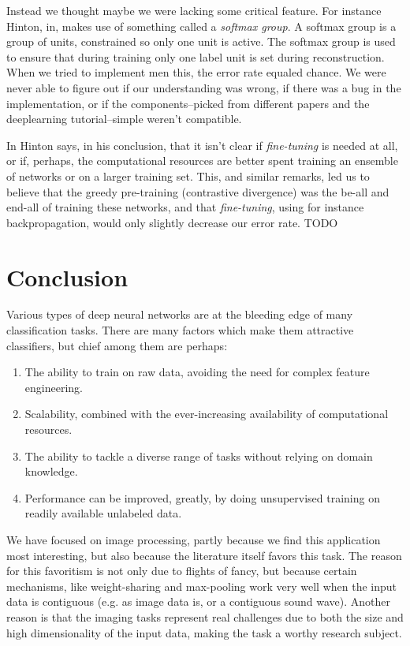 \documentclass[11pt]{article}
\begin{document}
Instead we thought maybe we were lacking some critical feature. For instance Hinton, in\cite{hinton06}, makes use of something called a \textit{softmax group}.  A softmax group is a group of units, constrained so only one unit is active.  The softmax group is used to ensure that during training only one label unit is set during reconstruction.  When we tried to implement men this, the error rate equaled chance.  We were never able to figure out if our understanding was wrong, if there was a bug in the implementation, or if the components--picked from different papers and the deeplearning tutorial--simple weren't compatible.

In \cite{hinton06} Hinton says, in his conclusion, that it isn't clear if \textit{fine-tuning} is needed at all, or if, perhaps, the computational resources are better spent training an ensemble of networks or on a larger training set.  This, and similar remarks, led us to believe that the greedy pre-training (contrastive divergence) was the be-all and end-all of training these networks, and that \textit{fine-tuning}, using for instance backpropagation, would only slightly decrease our error rate.  TODO

\section{Conclusion}

Various types of deep neural networks are at the bleeding edge of many classification tasks.  There are many factors which make them attractive classifiers, but chief among them are perhaps:
\begin{enumerate}
\item The ability to train on raw data, avoiding the need for complex feature engineering.
\item Scalability, combined with the ever-increasing availability of computational resources.
\item The ability to tackle a diverse range of tasks without relying on domain knowledge.
\item Performance can be improved, greatly, by doing unsupervised training on readily available unlabeled data.
\end{enumerate}

We have focused on image processing, partly because we find this application most interesting, but also because the literature itself favors this task.  The reason for this favoritism is not only due to flights of fancy, but because certain mechanisms, like weight-sharing and max-pooling work very well when the input data is contiguous (e.g. as image data is, or a contiguous sound wave).  Another reason is that the imaging tasks represent real challenges due to both the size and high dimensionality of the input data, making the task a worthy research subject.
\end{document}
